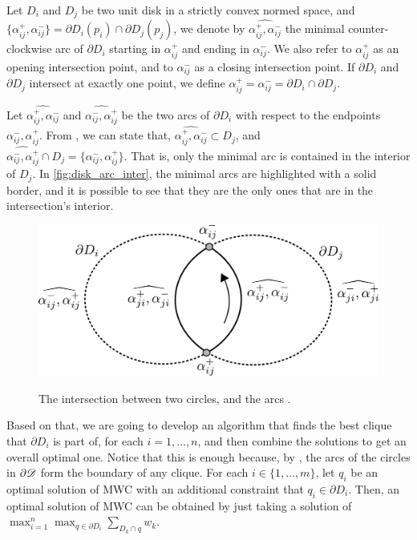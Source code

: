 \begin{definicao}
	Let $D_i$ and $D_j$ be two unit disk in a strictly convex normed space, and\\ \mbox{$\{\alpha_{ij}^+, \alpha_{ij}^-\} = \partial D_i(p_i) \cap \partial D_j(p_j)$},
	 we denote by $\widehat{\alpha_{ij}^+, \alpha_{ij}^-}$ the minimal counter-clockwise arc of $\partial D_i$ starting in $\alpha_{ij}^+$ and ending in $\alpha_{ij}^-$. We also refer to $\alpha_{ij}^+$ as an opening intersection point, and to $\alpha_{ij}^-$ as a closing intersection point.
	 If $\partial D_i$ and $\partial D_j$ intersect at exactly one point, we define $\alpha_{ij}^+ = \alpha_{ij}^- = \partial D_i \cap \partial D_j$.
\end{definicao}
Let $\widehat{\alpha_{ij}^+, \alpha_{ij}^-}$ and $\widehat{\alpha_{ij}^-, \alpha_{ij}^+}$ be the two arcs of $\partial D_i$ with respect to the endpoints $\alpha_{ij}^-, \alpha_{ij}^+$.
From , we can state that, $\widehat{\alpha_{ij}^+, \alpha_{ij}^-}\subset D_j$, and\\ $\widehat{\alpha_{ij}^-, \alpha_{ij}^+} \cap D_j = \{\alpha_{ij}^-, \alpha_{ij}^+\}$. That is, only the minimal arc is contained in the interior of $D_j$. In \autoref{fig:disk_arc_inter}, the minimal arcs are highlighted with a solid border, and it is possible to see that they are the only ones that are in the intersection's interior.

\begin{figure}[!htb]
	\centering
	
	\caption{The intersection between two circles, and the arcs .}
	\includegraphics[scale=.3]{tex/figures/disk_arc_inter.pdf}
	\fautor
	\label{fig:disk_arc_inter}
\end{figure}


Based on that, we are going to develop an algorithm that finds the best clique that $\partial D_i$ is part of, for each $i=1, \dots, n$, and then combine the solutions to get an overall optimal one. Notice that this is enough because, by , the arcs of the circles in $\partial \mathscr{D}$ form the boundary of any clique.
For each $i\in \{1, \dots, m\}$, let $q_i$ be an optimal solution of MWC with an additional constraint that $q_i \in \partial D_i$.
Then, an optimal solution of MWC can be obtained by just taking a solution of
$\max_{i=1}^n \max_{q \in \partial D_i} \sum_{D_k \cap q} w_k$.

